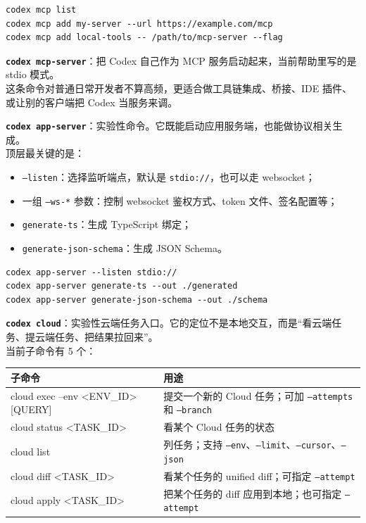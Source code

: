 \documentclass[UTF8,a4paper,12pt]{ctexart}
\begin{document}
\begin{lstlisting}[style=cli]
codex mcp list
codex mcp add my-server --url https://example.com/mcp
codex mcp add local-tools -- /path/to/mcp-server --flag
\end{lstlisting}

\medskip
\textbf{\texttt{codex mcp-server}}：把 Codex 自己作为 MCP 服务启动起来，当前帮助里写的是 stdio 模式。\\
这条命令对普通日常开发者不算高频，更适合做工具链集成、桥接、IDE 插件、或让别的客户端把 Codex 当服务来调。

\medskip
\textbf{\texttt{codex app-server}}：实验性命令。它既能启动应用服务端，也能做协议相关生成。\\
顶层最关键的是：
\begin{itemize}
  \item \texttt{--listen}：选择监听端点，默认是 \texttt{stdio://}，也可以走 websocket；
  \item 一组 \texttt{--ws-*} 参数：控制 websocket 鉴权方式、token 文件、签名配置等；
  \item \texttt{generate-ts}：生成 TypeScript 绑定；
  \item \texttt{generate-json-schema}：生成 JSON Schema。
\end{itemize}

\begin{lstlisting}[style=cli]
codex app-server --listen stdio://
codex app-server generate-ts --out ./generated
codex app-server generate-json-schema --out ./schema
\end{lstlisting}

\medskip
\textbf{\texttt{codex cloud}}：实验性云端任务入口。它的定位不是本地交互，而是“看云端任务、提云端任务、把结果拉回来”。\\
当前子命令有 5 个：

\begin{longtable}{>{\ttfamily\raggedright\arraybackslash}p{} >{\raggedright\arraybackslash}p{}}
\toprule
子命令 & 用途 \\
\midrule
\endhead
cloud exec --env <ENV\_ID> [QUERY] & 提交一个新的 Cloud 任务；可加 \texttt{--attempts} 和 \texttt{--branch} \\
cloud status <TASK\_ID> & 看某个 Cloud 任务的状态 \\
cloud list & 列任务；支持 \texttt{--env}、\texttt{--limit}、\texttt{--cursor}、\texttt{--json} \\
cloud diff <TASK\_ID> & 看某个任务的 unified diff；可指定 \texttt{--attempt} \\
cloud apply <TASK\_ID> & 把某个任务的 diff 应用到本地；也可指定 \texttt{--attempt} \\
\bottomrule
\end{longtable}
\end{document}
